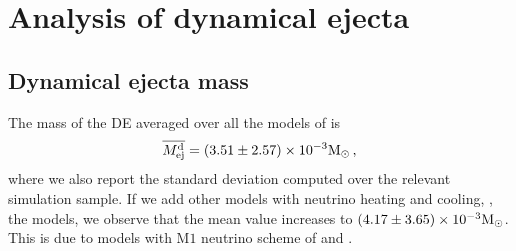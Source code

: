 
\section{Analysis of dynamical ejecta}
\label{sec:stat:ejecta}

%


\subsection{Dynamical ejecta mass}

The mass of the \ac{DE} averaged over all the models of \DSrefset{} is 
%
\begin{equation}
\label{eq:ejecta:dyn:avg:M}
\overline{M^{\text{d}}_{\text{ej}}} = (3.51 \pm 2.57)\times 10^{-3}{\text{M}_{\odot}}{}\, ,
\end{equation}
%
where we also report the standard deviation computed over the relevant simulation sample.
If we add other models with neutrino heating and cooling, \ie, the \DSheatcool{} models,
we observe that the mean value increases to $(4.17 \pm 3.65)\times 10^{-3}{\text{M}_{\odot}}{}$.
This is due to models with M$1$ neutrino scheme of \citet{Vincent:2019kor} and 
\citet{Sekiguchi:2016bjd}.

